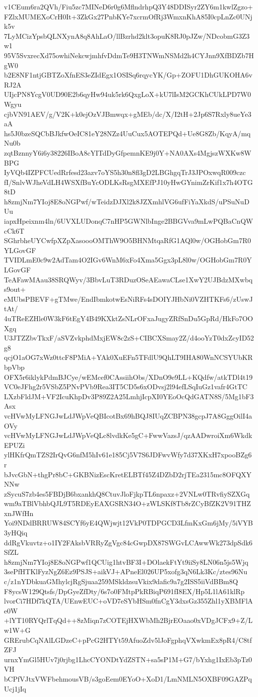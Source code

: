 v1CEum6ra2QVh/Fiu5zc7MINeD6r0g6MflndrhpQ3Y48DDISyr2ZY6m1kwlZgzo+
FZlxMUMEXoCrH0It+3ZkGx27PnbKYe7xcrmOfRj3WmxnKhA85I0cpLnZc0UNjk5v
7LyMCizYpsbQLNXynA8q8AhLaO/llBzrhd2klt3opuK8RJ0pJZw/NDcobmG3Z3w1
95V5SvxrecXd75owhiNekcwjmhfvDdmTe9H3TNWmNSMd2h4CYJnn9XfBDZb7HgW0
b2E8NF1ntjGBTZoXfnES3eZIdEgx1OSISq6rqycYK/Gp+ZOFU1DhGUKOHA6vRJ2A
UIjcPN8YcgV0UD90E2b6qyHw94uk5rk6QxgLoX+kU7lIsM2GCKhCUkLPD7W0Wgyu
cjbVN91AEV/g/V2K+k0ejOzVJBmwqx+gMEb/dc/X/I2tH+2Jp6S7Rxly8ueYe3aA
hs5J0bzeSQCbBJkfwOeIC81eY28NZz4UuCux5AOTEPQd+Ue8G8Zb/KqyA/mqNu0b
zqtBznnyY6i6y38226IBoA8cYITdDyGfpemnKE9j0Y+NA0AXs4MgjszWXKw8WBPG
IyVQb4IZPFCUedRrfesd23azv7oYS5h30n8fl3gD2LBGhgqTrJ3JPOxwqR009czc
fI/SnlvWJheVdLH4WSXfBuYcODLKsRsgMXEfPJ10yHwGYnimZrKif1x7h4OTG8tD
h8zmjNm7YIoj8E8oNGPwf/wTeidzDJXl2k8JZXmhlVG6ufFiYaXkdS/uPSuNuDUu
iapxHpeixnm4ln/6UVXLUDonqC7nHP5GWNlbInge2BBGVva9mLwPQBaCnQWcCk6T
SGhrbheUYCwfpXZpXasoooOMThW9O5BHNMtqaRfG1AQl0w/OGHobGm7R0YLGovGF
TVIDLmE0c9w2AdTam4O2IGv6WnM6xFo4Xma5Ggx3pL8l0w/OGHobGm7R0YLGovGF
TeAFawMAau38SRQWyv/3BbvLuT3RDuzOSeAEawaCLse1XwY2UJBdzMXwbqs9out+
eMUbsPBEVF+gTMwe/EndIbmkotwEsNiRFs4sDOIYJHbNi0VZHTKFs6/zUswJtAt/
4uTReEZHle0W3kF6tEgY4B49KXktZsNLrOFxaJugyZRfSnDu5GpRd/HkFo7OOXgq
U3JTZZbvTkxF/aSVZvkphdMxjEW8c2zS+CIBCXSmay2Z/d4ooYzT0dxZcyID52g8
qcjO1aOG7xWz0ttcF8PMiA+YAk0XuEFn5TFdlU9QhLT9IHA80WnNCSYUbKRbpVbp
OFX5r6iklykPdmBJCye/wEMcef0CAssiihObs/XDnO9e9LL+KQdfw/atkTDl4t19
VC0eJFhg2r5VSbZ5PNvPVb9Rea3IT5CD5s6xODvsj2l94efLSqIuGz1vafr4GtTC
LXzbFldJM+VF2IcuKhpDv3P89Z2A25LmhjIcpXI0YEoOcQdGATN8S/5Mg1bF3Asx
vcHVwMyLFNGJwLdJWpVeQBIcotBx69hBQJ8IUqZCBPN38gcpJ7A8GggOilI4aOVy
vcHVwMyLFNGJwLdJWpVeQLc8lvdkKe5gC+FwwVazsJ/qzAADwroiXm6WkdkEPUZi
ylHKfrQmTZS2IrQvG6nfM5hIv61e185Cj5V7S6JDFwvWfy7d37XKxH7xpooBZg6r
bJvcGbN+thgPr8bC+GKBNizEscKretELBTf45Z4DZbD2rjTEa2315mc8OFQXYNNw
zSycuS7zb4es5FBDjB6bxankhQ8CtuvJloFjkpTL6npaxz+2VNLw0TRvfiySZXGq
wm9aTBlVbhbQJL9T5RDEyEAXGSRN34O+zWLSKf8Tb8rZCyBfZK2V91THZxnJWfHn
Yoi9NDdBRRUW84SCYf6yE4QWjwjt12VkP0TDPGCD3LfmKxGm6jMy/5iVYB3yHQiq
ddRgVkuvtz+o1IY2FAksbVRRyZgVgc84cGwpDX87SWGvLCAwwWk273dpSdk6SfZL
h8zmjNm7YIoj8E8oNGPwf1QCUig1htvBF3I+DOlaekFtYt9iiSy8LN06n5js5Wjq
3sePfHTKlFyzNgZ6Ez9PSJS+aikVJ+APneEl026UP5xofg3qN6Lk3Kc/ztes96Nu
c/z1nYDbkuaGMhylcjRgSjuaa259MSkldzsuVkix9dafic9a7g2ISS5iiVdBBm8Q
F8ycsW129Qtsfs/DpGyeZfDty/6s7o0FMtpPkRBiqP691fI8EX/Hp5L1lA61klRp
lvorCi7HDf7kQTA/UEnwEUC+oVD7eSYbHSm0fnCgY3dxsGz355Zhl1yXBMFlAe0W
+lYT10RYQrlTqQd++8zMiqn7zCOTEjHXWbMh2BjrEOaao0xVDgJCFx9+Z/Lw1W+G
GRErubCqNAlLGDzeC+pPcG2HTYt59AfuoZdv5lJoFgphqVXwkmEx8pR4/C8tfZFJ
urnxYmGl5HUv7j0rjbg1LhcCYONDtYdZSTN+sa5sP1M+G7/bYxhg1IxEb3pTz0VH
bCPfVJtxVWFbehmousVB/s3goEem0EYoO+XoD1/LmNMLN5OXBF09GAZPqUcj1jIq
